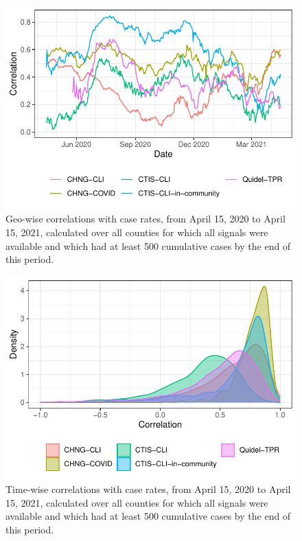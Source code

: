 \documentclass[9pt,twocolumn,twoside,lineno]{pnas-new}
\begin{document}
\begin{figure}[t]
  \includegraphics[width=\columnwidth]{fig/geo_wise_corr.pdf}
  \caption{Geo-wise correlations with case rates, from April 15, 2020 to April
    15, 2021, calculated over all counties for which all signals were available
    and which had at least 500 cumulative cases by the end of this period.}
  \label{fig:geo_wise_correlation}
\end{figure}

\begin{figure}[t]
  \includegraphics[width=\columnwidth]{fig/time_wise_correlation.pdf}
  \caption{Time-wise correlations with case rates, from April 15, 2020 to April
    15, 2021, calculated over all counties for which all signals were available
    and which had at least 500 cumulative cases by the end of this period.}
  \label{fig:time_wise_correlation}
\end{figure}
\end{document}

